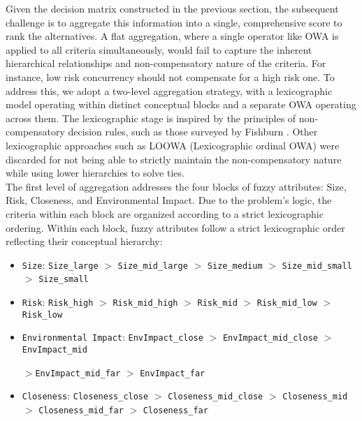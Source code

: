 Given the decision matrix constructed in the previous section, the subsequent challenge is to aggregate this information into a single, comprehensive score to rank the alternatives. A flat aggregation, where a single operator like OWA is applied to all criteria simultaneously, would fail to capture the inherent hierarchical relationships and non-compensatory nature of the criteria. For instance, low risk concurrency should not compensate for a high risk one. To address this, we adopt a two-level aggregation strategy, with a lexicographic model operating within distinct conceptual blocks and a separate OWA operating across them. The lexicographic stage is inspired by the principles of non-compensatory decision rules, such as those surveyed by Fishburn \cite{epsilon}. Other lexicographic approaches such as LOOWA\cite{LOOWA} (Lexicographic ordinal OWA) were discarded for not being able to strictly maintain the non-compensatory nature while using lower hierarchies to solve ties.\\

The first level of aggregation addresses the four blocks of fuzzy attributes: Size, Risk, Closeness, and Environmental Impact. Due to the problem's logic, the criteria within each block are organized according to a strict lexicographic ordering. 
Within each block, fuzzy attributes follow a strict lexicographic order reflecting their conceptual hierarchy:

\begin{itemize}
    \item \texttt{Size}: \texttt{Size\_large} $>$ \texttt{Size\_mid\_large} $>$ \texttt{Size\_medium} $>$ \texttt{Size\_mid\_small} $>$ \texttt{Size\_small}
    
    \item \texttt{Risk}: \texttt{Risk\_high} $>$ \texttt{Risk\_mid\_high} $>$ \texttt{Risk\_mid} $>$ \texttt{Risk\_mid\_low} $>$ \texttt{Risk\_low}
    
    \item \texttt{Environmental Impact}: \texttt{EnvImpact\_close} $>$ \texttt{EnvImpact\_mid\_close} $>$ \texttt{EnvImpact\_mid}
    
    $>$\texttt{EnvImpact\_mid\_far} $>$ \texttt{EnvImpact\_far}
    
    \item \texttt{Closeness}: \texttt{Closeness\_close} $>$ \texttt{Closeness\_mid\_close} $>$ \texttt{Closeness\_mid} $>$ \texttt{Closeness\_mid\_far} $>$ \texttt{Closeness\_far}
\end{itemize}


